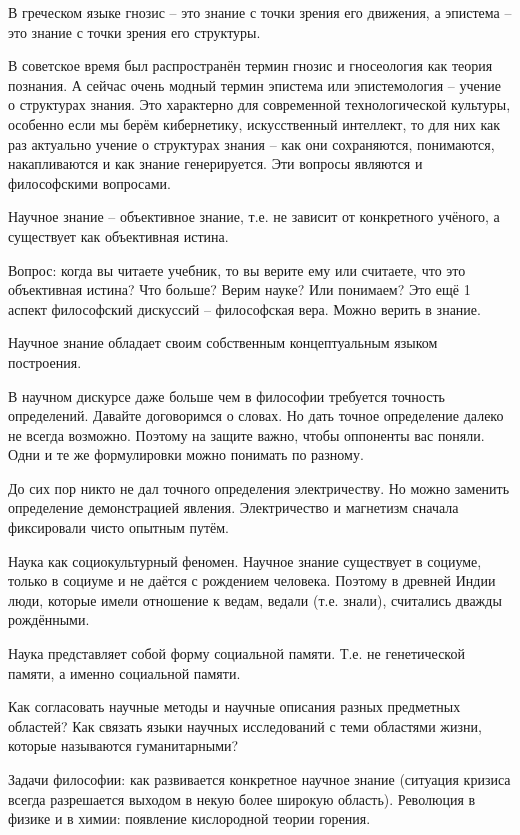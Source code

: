 \documentclass[main.tex]{subfiles}
\begin{document}
В греческом языке гнозис -- это знание с точки зрения его движения, а эпистема -- это знание с точки зрения его структуры.

В советское время был распространён термин гнозис и гносеология как теория познания.
А сейчас очень модный термин эпистема или эпистемология -- учение о структурах знания.
Это характерно для современной технологической культуры, особенно если мы берём кибернетику, искусственный интеллект, то для них как раз актуально учение о структурах знания -- как они сохраняются, понимаются, накапливаются и как знание генерируется.
Эти вопросы являются и философскими вопросами.

Научное знание -- объективное знание, т.е. не зависит от конкретного учёного, а существует как объективная истина.

Вопрос: когда вы читаете учебник, то вы верите ему или считаете, что это объективная истина?
Что больше?
Верим науке?
Или понимаем?
Это ещё 1 аспект философский дискуссий -- философская вера.
Можно верить в знание.

Научное знание обладает своим собственным концептуальным языком построения.

В научном дискурсе даже больше чем в философии требуется точность определений.
Давайте договоримся о словах.
Но дать точное определение далеко не всегда возможно.
Поэтому на защите важно, чтобы оппоненты вас поняли.
Одни и те же формулировки можно понимать по разному.

До сих пор никто не дал точного определения электричеству.
Но можно заменить определение демонстрацией явления.
Электричество и магнетизм сначала фиксировали чисто опытным путём.



Наука как социокультурный феномен.
Научное знание существует в социуме, только в социуме и не даётся с рождением человека.
Поэтому в древней Индии люди, которые имели отношение к ведам, ведали (т.е. знали), считались дважды рождёнными.

Наука представляет собой форму социальной памяти.
Т.е. не генетической памяти, а именно социальной памяти.

Как согласовать научные методы и научные описания разных предметных областей?
Как связать языки научных исследований с теми областями жизни, которые называются гуманитарными?

Задачи философии: как развивается конкретное научное знание (ситуация кризиса всегда разрешается выходом в некую более широкую область).
Революция в физике и в химии: появление кислородной теории горения.
\end{document}

